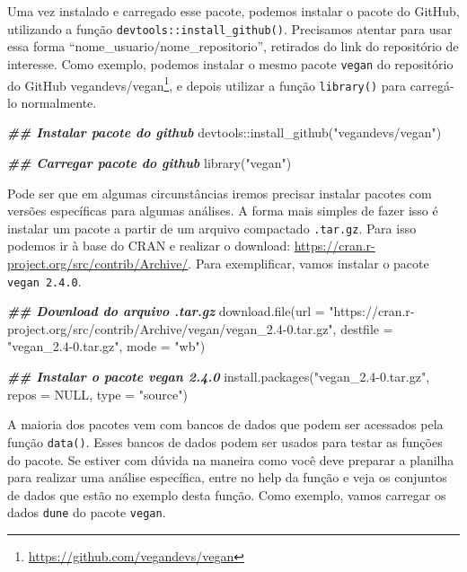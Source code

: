 \documentclass[
]{book}
\newenvironment{Shaded}{\begin{snugshade}}{\end{snugshade}}
\newcommand{\AttributeTok}[1]{\textcolor[rgb]{0.61,0.61,0.61}{#1}}
\newcommand{\ConstantTok}[1]{\textcolor[rgb]{0,0,0}{#1}}
\newcommand{\DocumentationTok}[1]{\textcolor[rgb]{0.37,0.37,0.37}{\textbf{\textit{#1}}}}
\newcommand{\FunctionTok}[1]{\textcolor[rgb]{0,0,0}{#1}}
\newcommand{\NormalTok}[1]{#1}
\newcommand{\SpecialCharTok}[1]{\textcolor[rgb]{0,0,0}{#1}}
\newcommand{\StringTok}[1]{\textcolor[rgb]{0.5,0.5,0.5}{#1}}
\renewcommand{\href}[2]{#2\footnote{\url{#1}}}
\begin{document}
Uma vez instalado e carregado esse pacote, podemos instalar o pacote do GitHub, utilizando a função \texttt{devtools::install\_github()}. Precisamos atentar para usar essa forma ``nome\_usuario/nome\_repositorio'', retirados do link do repositório de interesse. Como exemplo, podemos instalar o mesmo pacote \texttt{vegan} do repositório do GitHub \href{https://github.com/vegandevs/vegan}{vegandevs/vegan}, e depois utilizar a função \texttt{library()} para carregá-lo normalmente.

\begin{Shaded}
\begin{Highlighting}[]
\DocumentationTok{\#\# Instalar pacote do github}
\NormalTok{devtools}\SpecialCharTok{::}\FunctionTok{install\_github}\NormalTok{(}\StringTok{"vegandevs/vegan"}\NormalTok{)}

\DocumentationTok{\#\# Carregar pacote do github}
\FunctionTok{library}\NormalTok{(}\StringTok{"vegan"}\NormalTok{)}
\end{Highlighting}
\end{Shaded}

Pode ser que em algumas circunstâncias iremos precisar instalar pacotes com versões específicas para algumas análises. A forma mais simples de fazer isso é instalar um pacote a partir de um arquivo compactado \texttt{.tar.gz}. Para isso podemos ir à base do CRAN e realizar o download: \url{https://cran.r-project.org/src/contrib/Archive/}. Para exemplificar, vamos instalar o pacote \texttt{vegan\ 2.4.0}.

\begin{Shaded}
\begin{Highlighting}[]
\DocumentationTok{\#\# Download do arquivo .tar.gz}
\FunctionTok{download.file}\NormalTok{(}\AttributeTok{url =} \StringTok{"https://cran.r{-}project.org/src/contrib/Archive/vegan/vegan\_2.4{-}0.tar.gz"}\NormalTok{,}
              \AttributeTok{destfile =} \StringTok{"vegan\_2.4{-}0.tar.gz"}\NormalTok{, }\AttributeTok{mode =} \StringTok{"wb"}\NormalTok{)}

\DocumentationTok{\#\# Instalar o pacote vegan 2.4.0}
\FunctionTok{install.packages}\NormalTok{(}\StringTok{"vegan\_2.4{-}0.tar.gz"}\NormalTok{, }\AttributeTok{repos =} \ConstantTok{NULL}\NormalTok{, }\AttributeTok{type =} \StringTok{"source"}\NormalTok{)}
\end{Highlighting}
\end{Shaded}

A maioria dos pacotes vem com bancos de dados que podem ser acessados pela função \texttt{data()}. Esses bancos de dados podem ser usados para testar as funções do pacote. Se estiver com dúvida na maneira como você deve preparar a planilha para realizar uma análise específica, entre no help da função e veja os conjuntos de dados que estão no exemplo desta função. Como exemplo, vamos carregar os dados \texttt{dune} do pacote \texttt{vegan}.
\end{document}
